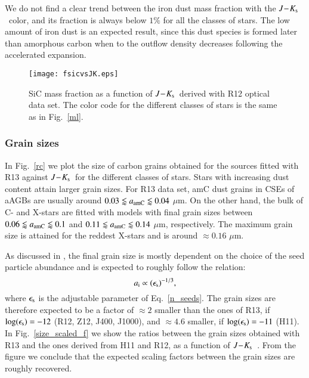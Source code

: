 \documentclass[useAMS,usenatbib]{mn2e/mn2e}
\newcommand{\jks}{\mbox{$J\!-\!K_{\rm s}$}}
\begin{document}
{We do not find a clear trend between the iron dust mass fraction with the \jks\ color, and its fraction is always below $1\%$ for all the classes of stars. 
The low amount of iron dust is an expected result, since this dust species is formed later than amorphous carbon when to the outflow density decreases following the accelerated expansion.

\begin{figure}
\texttt{[image: fsicvsJK.eps]}
        \caption{SiC mass fraction as a function of \jks\ derived with R12 optical data set. The color code for the different classes of stars is the same as in Fig.~\ref{ml}.}
        \label{dust_chem}
        \end{figure}

\subsubsection{Grain sizes}\label{sec:grains}
In Fig.~\ref{rc} we plot the size of carbon grains obtained for the sources fitted with R13 against \jks\, for the different classes of stars.
Stars with increasing dust content attain larger grain sizes.
For R13 data set, amC dust grains in CSEs of aAGBs are usually around $0.03\lessapprox a_{\rm amC}\lessapprox0.04$ $\mu$m. On the other hand, the bulk of C- and X-stars are fitted with models with final grain sizes between $0.06\lessapprox a_{\rm amC}\lessapprox0.1$ and $0.11 \lessapprox a_{\rm amC}\lessapprox 0.14$ $\mu$m, respectively. The maximum grain size is attained for the reddest X-stars and is around $\approx 0.16$ $\mu$m.

As discussed in \citet{Nanni16}, the final grain size is mostly dependent on the choice of the seed particle abundance and is expected to roughly follow the relation:
\begin{equation}\label{size_scaled}
a_{\rm i}\propto (\epsilon_{\rm s})^{-1/3},
\end{equation}
%
where $\epsilon_{\rm s}$ is the adjustable parameter of Eq.~\ref{n_seeds}. 
The grain sizes are therefore expected to be a factor of $\approx 2$ smaller than the ones of R13, if $\log(\epsilon_{\rm s})=-12$ (R12, Z12, J400, J1000), and $\approx 4.6$ smaller, if $\log(\epsilon_{\rm s})=-11$ (H11).
In Fig.~\ref{size_scaled_f} we show the ratios between the grain sizes obtained with R13 and the ones derived from H11 and R12, as a function of \jks\ .
From the figure we conclude that the expected scaling factors between the grain sizes are roughly recovered.

}
\end{document}
